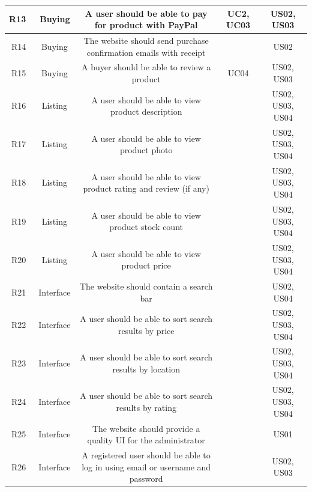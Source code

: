 \documentclass[11pt]{article}
\newcounter{use case ID}
\begin{document}
\begin{table}[H]
\begin{adjustbox}{width=\columnwidth,center}
\begin{tabular}{|r | c| c | c| c|}
                \hline
                R13 & \ Buying & A user should be able to pay for \index{product}product with \index{PayPal}PayPal & UC2, UC03 & US02, US03 \\
                \hline
                R14 & \ Buying & The website should send purchase confirmation emails with \index{receipt}receipt & & US02 \\
                \hline
                R15 & \ Buying & A \index{buyer}buyer should be able to \index{review}review a product & UC04 & US02, US03 \\
                \hline
                R16 & \ Listing & A user should be able to view \index{product}product description & & US02, US03, US04 \\
                \hline
                R17 & \ Listing & A user should be able to view product photo & & US02, US03, US04 \\
                \hline
                R18 & \ Listing & A user should be able to view product rating and review (if any) & & US02, US03, US04 \\
                \hline
                R19 & \ Listing & A user should be able to view product stock count & & US02, US03, US04 \\
                \hline
                R20 & \ Listing & A user should be able to view \index{product}product price & & US02, US03, US04 \\
                    \hline
                R21 & \ Interface & The website should contain a search bar & & US02, US04 \\
                \hline
                R22 & \ Interface & A user should be able to sort search results by price  & & US02, US03, US04 \\
                \hline
                R23 & \ Interface & A user should be able to sort search results by location  & & US02, US03, US04 \\
                \hline
                R24 & \ Interface & A user should be able to sort search results by rating  & & US02, US03, US04 \\
                \hline
                R25 & \ Interface & The website should provide a quality UI for the \index{administrator}administrator & & US01 \\
                \hline
                R26 & \ Interface & A \index{registered user}registered user should be able to log in using email or username and password & & US02, US03 \\
                \hline

\end{tabular}
\end{adjustbox}
\end{table}
\end{document}
